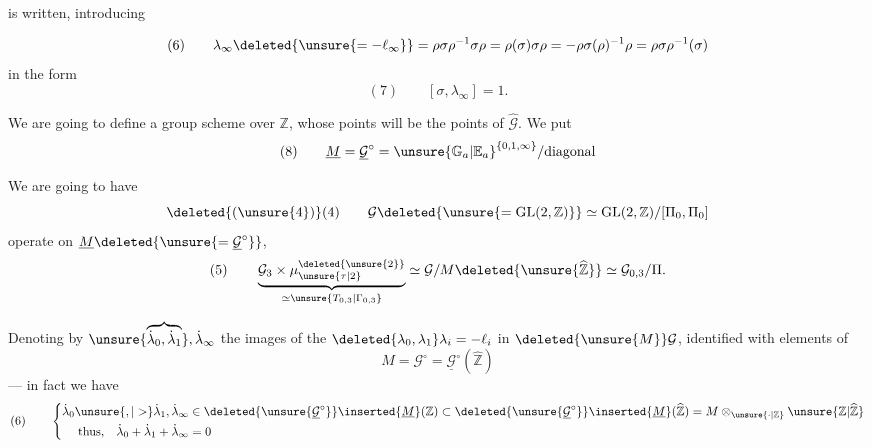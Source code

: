 
is written, introducing


\[
(6)\qquad
\lambda_\infty\deleted{\unsure{=-\ell_\infty}}
=\rho\sigma\rho^{-1}\sigma\rho
=\rho(\sigma)\sigma\rho
=-\rho\sigma(\rho)^{-1}\rho
=\rho\sigma\rho^{-1}(\sigma)
\]
in the form
\[
(7)\qquad [\sigma,\lambda_\infty]=1.
\]


We are going to define a group scheme  over $\mathbb{Z}$, whose points will be  the points of $\widehat{\mathcal{G}}$. We put
\[
(8)\qquad
\underline{M}=\underline{\mathcal{G}}^{\circ}
=\unsure{\mathbb{G}_a|\mathbb{E}_a}^{\{0,1,\infty\}}/\text{diagonal}
\]

We are going to have 
\[
\deleted{(\unsure{4})}(4)\qquad
\mathcal{G}\deleted{\unsure{=\operatorname{GL}(2,\mathbb{Z})}}
\simeq\operatorname{GL}(2,\mathbb{Z})/[\Pi_0,\Pi_0]
\]
operate on $\underline{M}\deleted{\unsure{=\underline{\mathcal{G}}^{\circ}}}$,
 
\[
(5)\qquad
\underbrace{\mathcal{G}_3\times\mu_{\unsure{\tau|2}}^{\deleted{\unsure{2}}}}_{\simeq\unsure{T_{0,3}|\Gamma_{0,3}}}
\simeq\mathcal{G}/M\deleted{\unsure{\widehat{\mathbb{Z}}}}
\simeq\mathcal{G}_{0,3}/\Pi.
\]

Denoting by $\unsure{\overbrace{\dot{\lambda}_0,\dot{\lambda}_1}},\dot{\lambda}_\infty$ the images of the
$\deleted{\lambda_0,\lambda_1}\lambda_i=-\ell_i$ in $\deleted{\unsure{M}}\mathcal{G}$, identified with elements of
\[
M=\mathcal{G}^{\circ}=\underline{\mathcal{G}}^{\circ}(\widehat{\mathbb{Z}})
\]
--- in fact we have
\[
(6)\qquad
\left\{
\begin{aligned}
\dot{\lambda}_0\unsure{,|>}\dot{\lambda}_1,\dot{\lambda}_\infty
&\in\deleted{\unsure{\underline{\mathcal{G}}^{\circ}}}\inserted{\underline{M}}(\mathbb{Z})
\subset\deleted{\unsure{\underline{\mathcal{G}}^{\circ}}}\inserted{\underline{M}}(\widehat{\mathbb{Z}})
=M\otimes_{\unsure{\cdot|\mathbb{Z}}}\unsure{\mathbb{Z}|\widehat{\mathbb{Z}}}\\
\text{thus,}\quad\dot{\lambda}_0+\dot{\lambda}_1+\dot{\lambda}_\infty&=0
\end{aligned}\right.
\]


